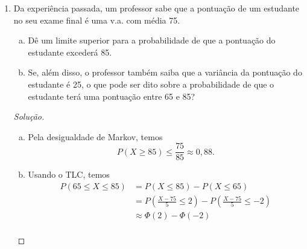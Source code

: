 \documentclass[../Notas.tex]{subfiles}
\begin{document}
\begin{enumerate}
\begin{proof}[Solução]
\begin{enumerate}[a)]
\begin{align*}
                                                       &= P(\overline{X} \leq \mu + \sigma/10) - 
                                                       P(\overline{X} \leq \mu - \sigma/10) \\
                                                       &= P(S_n \leq n\mu + n\sigma/10) - P(S_n \leq n\mu - n\sigma/10).
            \end{align*}
            Usando o TLC, temos que essa probabilidade pode ser aproximada por
            \[
            \Phi(\sqrt{n}/10) - \Phi(-\sqrt{n}/10) = 2\Phi(\sqrt{n}/10) - 1.
            \]
            Portanto, para que a probabilidade desejada seja pelo menos $0,95$, devemos ter $n$ tal que
            \[
            \Phi(\sqrt{n}/10) \geq 0,975 \iff \frac{\sqrt{n}}{10} \geq 1,96 \iff n \geq 384,16.
            \]
            Como $n\in\mathbb{N}$, devemos ter uma amostra de tamanho 385, pelo menos.
        \end{enumerate}
    \end{proof}
    \item Da experiência passada, um professor sabe que a pontuação de um estudante no seu exame final é uma v.a. com média 75.
    \begin{enumerate}[a)]
    \item Dê um limite superior para a probabilidade de que a pontuação do estudante excederá 85.
    \item Se, além disso, o professor também saiba que a variância da pontuação do estudante é 25, o que pode ser dito sobre a probabilidade de que o estudante terá uma pontuação entre 65 e 85?
    \end{enumerate}
    \begin{proof}[Solução]
        \begin{enumerate}[a)]
            \item Pela desigualdade de Markov, temos
            \[
            P(X\geq 85) \leq \frac{75}{85} \approx 0,88.
            \]
            \item Usando o TLC, temos
            \begin{align*}
                P(65 \leq X \leq 85) &= P(X\leq 85) - P(X\leq 65) \\
                                     &= P\left(\frac{X - 75}{5} \leq 2\right) - P\left(\frac{X - 75}{5} \leq -2\right) \\
                                     &\approx \Phi(2) - \Phi(-2) \\

\end{align*}
\end{enumerate}
\end{proof}
\end{enumerate}
\end{document}
